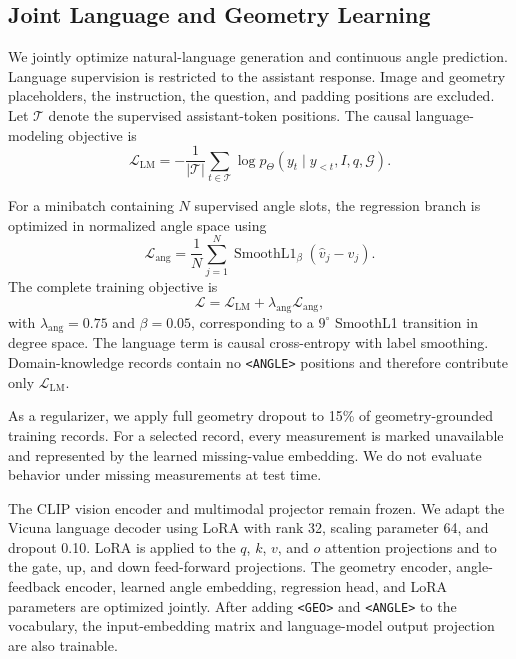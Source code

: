 \subsection{Joint Language and Geometry Learning}
\label{sec:training_objective}

We jointly optimize natural-language generation and continuous angle prediction.
Language supervision is restricted to the assistant response.
Image and geometry placeholders, the instruction, the question, and padding positions are excluded.
Let $\mathcal{T}$ denote the supervised assistant-token positions.
The causal language-modeling objective is
\begin{equation}
    \mathcal{L}_{\mathrm{LM}}
    =-\frac{1}{|\mathcal{T}|}
    \sum_{t\in\mathcal{T}}
    \log p_{\Theta}\!\left(
        y_t\mid y_{<t},I,q,\mathcal{G}
    \right).
    \label{eq:language_loss}
\end{equation}

For a minibatch containing $N$ supervised angle slots, the regression branch is optimized in normalized angle space using
\begin{equation}
    \mathcal{L}_{\mathrm{ang}}
    =\frac{1}{N}\sum_{j=1}^{N}
    \operatorname{SmoothL1}_{\beta}
    \!\left(\widehat{v}_j-v_j\right).
    \label{eq:regression_loss}
\end{equation}
The complete training objective is
\begin{equation}
    \mathcal{L}
    =\mathcal{L}_{\mathrm{LM}}
    +\lambda_{\mathrm{ang}}\mathcal{L}_{\mathrm{ang}},
    \label{eq:total_loss}
\end{equation}
with $\lambda_{\mathrm{ang}}=0.75$ and $\beta=0.05$, corresponding to a $9^\circ$ SmoothL1 transition in degree space.
The language term is causal cross-entropy with label smoothing.
Domain-knowledge records contain no \texttt{<ANGLE>} positions and therefore contribute only $\mathcal{L}_{\mathrm{LM}}$.

As a regularizer, we apply full geometry dropout to 15\% of geometry-grounded training records.
For a selected record, every measurement is marked unavailable and represented by the learned missing-value embedding.
We do not evaluate behavior under missing measurements at test time.

The CLIP vision encoder and multimodal projector remain frozen.
We adapt the Vicuna language decoder using LoRA with rank 32, scaling parameter 64, and dropout 0.10.
LoRA is applied to the $q$, $k$, $v$, and $o$ attention projections and to the gate, up, and down feed-forward projections.
The geometry encoder, angle-feedback encoder, learned angle embedding, regression head, and LoRA parameters are optimized jointly.
After adding \texttt{<GEO>} and \texttt{<ANGLE>} to the vocabulary, the input-embedding matrix and language-model output projection are also trainable.

